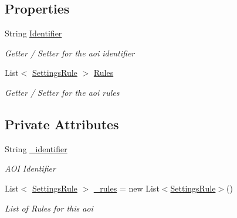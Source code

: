 \subsection*{Properties}
\begin{DoxyCompactItemize}
\item 
String \hyperlink{class_web_analyzer_1_1_models_1_1_settings_model_1_1_a_o_i_settings_a6fee5ecaba688289bfd5795367250339}{Identifier}
\begin{DoxyCompactList}\small\item\em Getter / Setter for the aoi identifier \end{DoxyCompactList}\item 
List$<$ \hyperlink{class_web_analyzer_1_1_models_1_1_settings_model_1_1_settings_rule}{Settings\+Rule} $>$ \hyperlink{class_web_analyzer_1_1_models_1_1_settings_model_1_1_a_o_i_settings_a8852191a79accfc1288d0fb6a2b4a14c}{Rules}
\begin{DoxyCompactList}\small\item\em Getter / Setter for the aoi rules \end{DoxyCompactList}\end{DoxyCompactItemize}
\subsection*{Private Attributes}
\begin{DoxyCompactItemize}
\item 
String \hyperlink{class_web_analyzer_1_1_models_1_1_settings_model_1_1_a_o_i_settings_aaad4690527bd5ad5075cd87df38b249e}{\+\_\+identifier}
\begin{DoxyCompactList}\small\item\em A\+O\+I Identifier \end{DoxyCompactList}\item 
List$<$ \hyperlink{class_web_analyzer_1_1_models_1_1_settings_model_1_1_settings_rule}{Settings\+Rule} $>$ \hyperlink{class_web_analyzer_1_1_models_1_1_settings_model_1_1_a_o_i_settings_a36ff6cc7414c41d4b619b3101977ff4c}{\+\_\+rules} = new List$<$\hyperlink{class_web_analyzer_1_1_models_1_1_settings_model_1_1_settings_rule}{Settings\+Rule}$>$()
\begin{DoxyCompactList}\small\item\em List of Rules for this aoi \end{DoxyCompactList}\end{DoxyCompactItemize}


